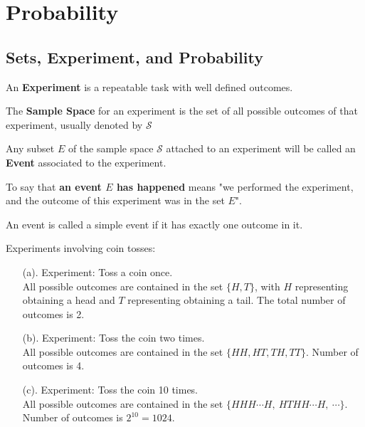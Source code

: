 \chapter[Probability]{Probability}
\section{Sets, Experiment, and Probability}
\begin{defn}[Experiment]
An \textbf{Experiment} is a repeatable task with well defined outcomes.
\end{defn}

\begin{defn} 
The \textbf{Sample Space} for an experiment is the set of all possible outcomes of that experiment, usually denoted by $\mathcal{S}$
\end{defn}

\begin{defn}[Event]
Any subset $E$ of the sample space $\mathcal{S}$ attached to an experiment will be called an \textbf{Event} associated to the experiment. 
\end{defn}
To say that \textbf{an event $E$ has happened} means "we performed the experiment, and the outcome of this experiment was in the set $E$". 

\begin{defn}
An event is called a  simple event if it has exactly one outcome in it.  
\end{defn}

\begin{ex}
    Experiments involving coin tosses:
    \begin{enumerate}
\item[(a).] Experiment: Toss a coin once. \\
All possible outcomes are contained in the set $\{H,T\}$, with $H$ representing obtaining a head and $T$ representing obtaining a tail. The total number of outcomes is 2. 
\item[(b).] Experiment: Toss the coin two times.\\
All possible outcomes are contained in the set $\{HH, HT, TH, TT\}$. Number of outcomes is 4. 
\item[(c).] Experiment: Toss the coin 10 times.\\
All possible outcomes are contained in the set $\{HHH\cdots H,\ HTHH\cdots H,\ \cdots\}$. Number of outcomes is $2^{10}=1024$. 
\end{enumerate}
\end{ex}

